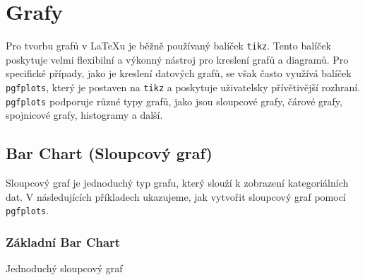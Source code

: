\chapter{Grafy}

Pro tvorbu grafů v \LaTeX{}u je běžně používaný balíček \texttt{tikz}. Tento balíček poskytuje velmi flexibilní a výkonný nástroj pro kreslení grafů a diagramů. Pro specifické případy, jako je kreslení datových grafů, se však často využívá balíček \texttt{pgfplots}, který je postaven na \texttt{tikz} a poskytuje uživatelsky přívětivější rozhraní. \texttt{pgfplots} podporuje různé typy grafů, jako jsou sloupcové grafy, čárové grafy, spojnicové grafy, histogramy a další.

\section{Bar Chart (Sloupcový graf)}

Sloupcový graf je jednoduchý typ grafu, který slouží k zobrazení kategoriálních dat. V následujících příkladech ukazujeme, jak vytvořit sloupcový graf pomocí \texttt{pgfplots}.

\subsection{Základní Bar Chart}
\begin{chart}[H]
    \centering
    \caption{Jednoduchý sloupcový graf}
    \label{chart:bar}
\end{chart}

